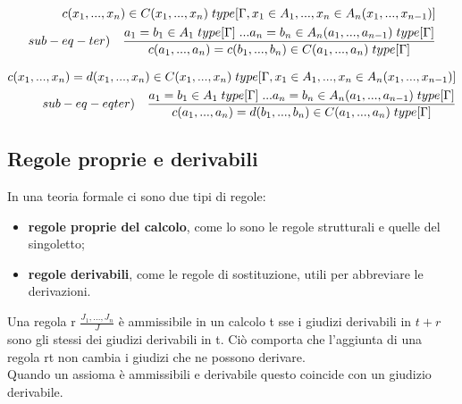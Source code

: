 \documentclass[10pt,a4paper, italian]{book}
\begin{document}
{{\begin{equation}
\begin{split}
c(x_1,...,x_n) \in C(x_1,...,x_n) \hspace{0.1cm}type[\Gamma, x_1 \in A_1,...,x_n \in A_n(x_1,...,x_{n-1})] \\ sub-eq-ter) \quad \frac{a_1 = b_1 \in A_1\hspace{0.1cm}type[\Gamma]\hspace{0.1cm}...a_n = b_n \in A_n(a_1,...,a_{n-1})\hspace{0.1cm}type[\Gamma]}{ c(a_1,...,a_n) = c(b_1,...,b_n) \in C(a_1,...,a_n)\hspace{0.1cm}type[\Gamma]}
\end{split}
\end{equation}

\begin{equation}
\begin{split}
c(x_1,...,x_n) = d(x_1,...,x_n) \in C(x_1,...,x_n) \hspace{0.1cm}type[\Gamma, x_1 \in A_1,...,x_n \in A_n(x_1,...,x_{n-1})] \\ sub-eq-eqter) \quad \frac{a_1 = b_1 \in A_1\hspace{0.1cm}type[\Gamma]\hspace{0.1cm}...a_n = b_n \in A_n(a_1,...,a_{n-1})\hspace{0.1cm}type[\Gamma]}{ c(a_1,...,a_n) = d(b_1,...,b_n) \in C(a_1,...,a_n)\hspace{0.1cm}type[\Gamma]}
\end{split}
\end{equation}

\subsection{Regole proprie e derivabili}
\label{subsec:regole-proprie-derivabili}
In una teoria formale ci sono due tipi di regole:
\begin{itemize}
\item \textbf{regole proprie del calcolo}, come lo sono le regole strutturali e quelle del singoletto;
\item \textbf{regole derivabili}, come le regole di sostituzione, utili per abbreviare le derivazioni.
\end{itemize}
\noindent
Una regola r $\frac{J_1,...,J_n}{J}$ \`e ammissibile in un calcolo t sse i giudizi derivabili in $t+r$ sono gli stessi dei giudizi derivabili in t. Ci\`o comporta che l'aggiunta di una regola rt non cambia i giudizi che ne possono derivare.\\ Quando un assioma \`e ammissibili e derivabile questo coincide con un giudizio derivabile.

}}
\end{document}
